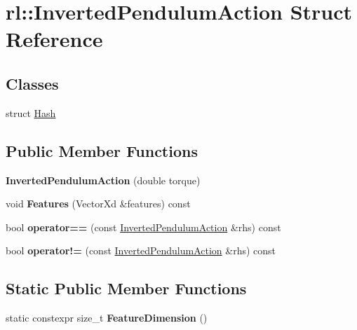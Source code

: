 \hypertarget{structrl_1_1_inverted_pendulum_action}{}\section{rl\+:\+:Inverted\+Pendulum\+Action Struct Reference}
\label{structrl_1_1_inverted_pendulum_action}
\subsection*{Classes}
\begin{DoxyCompactItemize}
\item 
struct \hyperlink{structrl_1_1_inverted_pendulum_action_1_1_hash}{Hash}
\end{DoxyCompactItemize}
\subsection*{Public Member Functions}
\begin{DoxyCompactItemize}
\item 
\hypertarget{structrl_1_1_inverted_pendulum_action_a190a9ecac695bc5df25941fd0b31b8e4}{}\label{structrl_1_1_inverted_pendulum_action_a190a9ecac695bc5df25941fd0b31b8e4} 
{\bfseries Inverted\+Pendulum\+Action} (double torque)
\item 
\hypertarget{structrl_1_1_inverted_pendulum_action_a88975dbb6741e411335a3b864147555e}{}\label{structrl_1_1_inverted_pendulum_action_a88975dbb6741e411335a3b864147555e} 
void {\bfseries Features} (Vector\+Xd \&features) const
\item 
\hypertarget{structrl_1_1_inverted_pendulum_action_aec8902ca65267c3cf3112c19e45c7ce6}{}\label{structrl_1_1_inverted_pendulum_action_aec8902ca65267c3cf3112c19e45c7ce6} 
bool {\bfseries operator==} (const \hyperlink{structrl_1_1_inverted_pendulum_action}{Inverted\+Pendulum\+Action} \&rhs) const
\item 
\hypertarget{structrl_1_1_inverted_pendulum_action_abf6659b246c13e9892ee60cff709cd98}{}\label{structrl_1_1_inverted_pendulum_action_abf6659b246c13e9892ee60cff709cd98} 
bool {\bfseries operator!=} (const \hyperlink{structrl_1_1_inverted_pendulum_action}{Inverted\+Pendulum\+Action} \&rhs) const
\end{DoxyCompactItemize}
\subsection*{Static Public Member Functions}
\begin{DoxyCompactItemize}
\item 
\hypertarget{structrl_1_1_inverted_pendulum_action_aa180acad4dc081aed0a5639141f4cda6}{}\label{structrl_1_1_inverted_pendulum_action_aa180acad4dc081aed0a5639141f4cda6} 
static constexpr size\+\_\+t {\bfseries Feature\+Dimension} ()
\end{DoxyCompactItemize}
